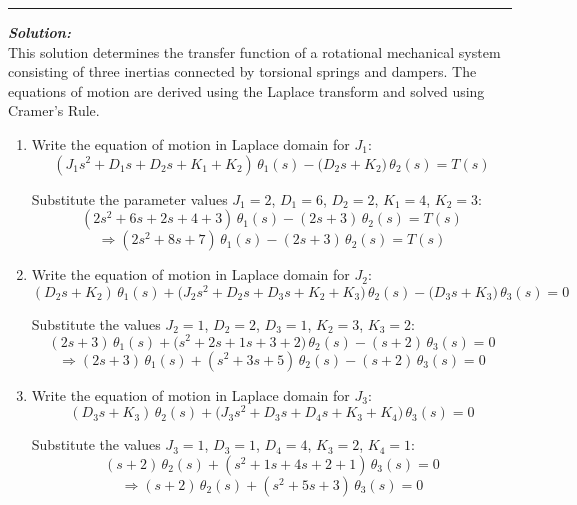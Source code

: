\documentclass[11pt]{article}
\begin{document}
\noindent\rule{\textwidth}{1pt}

\vspace{12pt}

\noindent \textbf{\textit{Solution:}}
\\ This solution determines the transfer function of a rotational mechanical system consisting of three inertias connected by torsional springs and dampers. The equations of motion are derived using the Laplace transform and solved using Cramer's Rule.\\

\begin{enumerate}[label=(\alph*), itemindent=*, leftmargin=*, nolistsep]
    \item Write the equation of motion in Laplace domain for $J_1$:
    \[
        (J_1 s^2 + D_1 s + D_2 s + K_1 + K_2)\,\theta_1(s)
        - \big(D_2 s + K_2\big)\,\theta_2(s) = T(s)
    \]

    Substitute the parameter values $J_1 = 2$, $D_1 = 6$, $D_2 = 2$, $K_1 = 4$, $K_2 = 3$:
    \[
    (2s^2 + 6s + 2s + 4 + 3)\,\theta_1(s) - (2s + 3)\,\theta_2(s) = T(s)
    \]
    \[
    \Rightarrow (2s^2 + 8s + 7)\,\theta_1(s) - (2s + 3)\,\theta_2(s) = T(s)
    \]

    \item Write the equation of motion in Laplace domain for $J_2$:
    \[
    (D_2 s + K_2)\,\theta_1(s)
    + \big(J_2 s^2 + D_2 s + D_3 s + K_2 + K_3\big)\,\theta_2(s)
    - \big(D_3 s + K_3\big)\,\theta_3(s) = 0
    \]

    Substitute the values $J_2 = 1$, $D_2 = 2$, $D_3 = 1$, $K_2 = 3$, $K_3 = 2$:
    \[
    (2s + 3)\,\theta_1(s) + \big(s^2 + 2s + 1s + 3 + 2\big)\,\theta_2(s) - (s + 2)\,\theta_3(s) = 0
    \]
    \[
    \Rightarrow (2s + 3)\,\theta_1(s) + (s^2 + 3s + 5)\,\theta_2(s) - (s + 2)\,\theta_3(s) = 0
    \]

    \item Write the equation of motion in Laplace domain for $J_3$:
    \[
    (D_3 s + K_3)\,\theta_2(s)
    + \big(J_3 s^2 + D_3 s + D_4 s + K_3 + K_4\big)\,\theta_3(s) = 0
    \]

    Substitute the values $J_3 = 1$, $D_3 = 1$, $D_4 = 4$, $K_3 = 2$, $K_4 = 1$:
    \[
    (s + 2)\,\theta_2(s) + (s^2 + 1s + 4s + 2 + 1)\,\theta_3(s) = 0
    \]
    \[
    \Rightarrow (s + 2)\,\theta_2(s) + (s^2 + 5s + 3)\,\theta_3(s) = 0
    \]


\end{enumerate}
\end{document}
